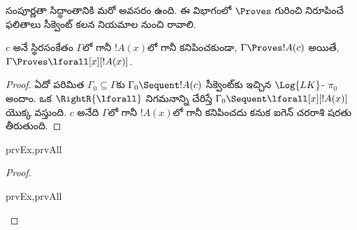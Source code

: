 \documentclass[../../../include/open-logic-section]{subfiles}
\begin{document}

\begin{explain}
  సంపూర్ణతా సిద్ధాంతానికి మరో అవసరం ఉంది. ఈ విభాగంలో $\Proves$ గురించి
  నిరూపించే ఫలితాలు సీక్వెంట్ కలన నియమాల నుంచి రావాలి.
\end{explain}

\begin{thm}
 $c$ అనే స్థిరసంకేతం $\Gamma$లో గానీ
$!A(x)$లో గానీ కనిపించకుండా, $\Gamma \Proves !A(c)$ అయితే,
$\Gamma \Proves \lforall[x][!A(x)]$.
\end{thm}

\begin{proof}
ఏదో పరిమిత $\Gamma_0 \subseteq \Gamma$కు $\Gamma_0 \Sequent !A(c)$
సీక్వెంట్‌కు ఇచ్చిన $\Log{LK}$- $\pi_0$ అందాం. ఒక
$\RightR{\lforall}$ నిగమనాన్ని చేరిస్తే
$\Gamma_0 \Sequent \lforall[x][!A(x)]$ యొక్క  వస్తుంది.
$c$ అనేది $\Gamma$లో గానీ $!A(x)$లో గానీ కనిపించదు కనుక ఐగెన్
చరరాశి షరతు తీరుతుంది.
\end{proof}

\begin{prop}
\begin{tagenumerate}{prvEx,prvAll}
\end{tagenumerate}
\end{prop}

\begin{proof}
\begin{tagenumerate}{prvEx,prvAll}
\end{tagenumerate}
\end{proof}
\end{document}
